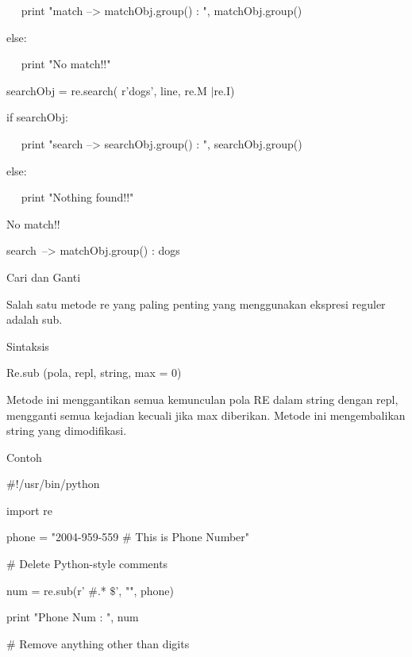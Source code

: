 \documentclass[a4paper,12pt]{report}
\begin{document}
~~ print "match --> matchObj.group() : ", matchObj.group() \par
\noindent 
else: \par
\noindent 
~~ print "No match!!" \par
\vspace{12pt}
\noindent 
searchObj = re.search( r'dogs', line, re.M $  \vert  $re.I) \par
\noindent 
if searchObj: \par
\noindent 
~~ print "search --> searchObj.group() : ", searchObj.group() \par
\noindent 
else: \par
\noindent 
~~ print "Nothing found!!" \par
\vspace{12pt}
\noindent 
No match!! \par
\noindent 
search~--> matchObj.group() :  dogs \par
\vspace{12pt}
\noindent 
Cari dan Ganti \par
\vspace{12pt}
\noindent 
Salah satu metode re yang paling penting yang menggunakan ekspresi reguler adalah sub. \par
\noindent 
Sintaksis \par
\vspace{12pt}
\noindent 
Re.sub (pola, repl, string, max = 0) \par
\vspace{12pt}
\noindent 
Metode ini menggantikan semua kemunculan pola RE dalam string dengan repl, mengganti semua kejadian kecuali jika max diberikan. Metode ini mengembalikan string yang dimodifikasi. \par
\noindent 
Contoh \par
\noindent 
 $  \#  $!/usr/bin/python \par
\noindent 
import re \par
\vspace{12pt}
\noindent 
phone = "2004-959-559  $  \#  $ This is Phone Number" \par
\vspace{12pt}
\noindent 
 $  \#  $ Delete Python-style comments \par
\noindent 
num = re.sub(r' $  \#  $.* $  \$  $', "", phone) \par
\noindent 
print "Phone Num : ", num \par
\vspace{12pt}
\noindent 
 $  \#  $ Remove anything other than digits \par
\end{document}

